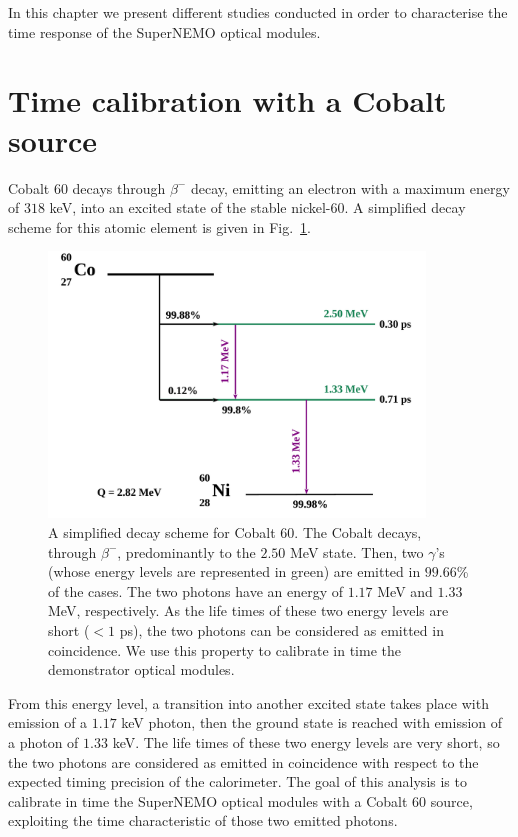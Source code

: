 In this chapter we present different studies conducted in order to characterise the time response of the SuperNEMO optical modules.


\section{Time calibration with a Cobalt source}
\label{sec:CoSource}
Cobalt $60$ decays through $\beta^{-}$ decay, emitting an electron with a maximum energy of $318$ keV, into an excited state of the stable nickel-60.
A simplified decay scheme for this atomic element is given in Fig.~\ref{fig:Co_decay_scheme}.
\begin{figure}[h]
  \centering
  \includegraphics[width=10cm]{commissioning/fig_commissioning/Co_decay_scheme.pdf}
  \caption{A simplified decay scheme for Cobalt $60$.
    The Cobalt decays, through $\beta^{-}$, predominantly to the $2.50$ MeV state.
    Then, two $\gamma$'s (whose energy levels are represented in green) are emitted in $99.66$\% of the cases.
    The two photons have an energy of $1.17$ MeV and $1.33$ MeV, respectively.
    As the life times of these two energy levels are short ($<1$ ps), the two photons can be considered as emitted in coincidence.
    We use this property to calibrate in time the demonstrator optical modules.
    \label{fig:Co_decay_scheme}}
\end{figure}
From this energy level, a transition into another excited state takes place with emission of a $1.17$ keV photon, then the ground state is reached with emission of a photon of $1.33$ keV.
The life times of these two energy levels are very short, so the two photons are considered as emitted in coincidence with respect to the expected timing precision of the calorimeter.
The goal of this analysis is to calibrate in time the SuperNEMO optical modules with a Cobalt $60$ source, exploiting the time characteristic of those two emitted photons.

